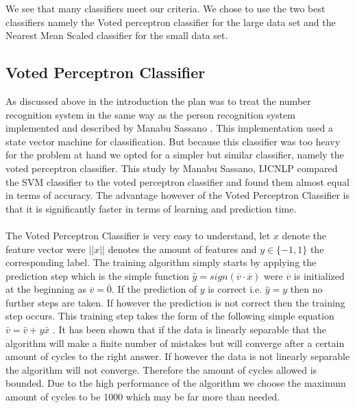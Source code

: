 \documentclass[%
        compressed,
        final,
        notitlepage,
        narroweqnarray,
        inline,
        twoside,
        ]{ieee}
\begin{document}
We see that many classifiers meet our criteria. We chose to use the two best
classifiers namely the Voted perceptron classifier for the large data set and
the Nearest Mean Scaled classifier for the small data set.

\subsection{Voted Perceptron Classifier}
As discussed above in the introduction the plan was to treat the number
recognition system in the same way as the person recognition system implemented
and described by Manabu Sassano \cite{Manabu}.
This implementation used a state vector machine for classification. But because
this classifier was too heavy for the problem at hand we opted for a simpler but
similar classifier, namely the voted perceptron classifier. This study by Manabu
Sassano, IJCNLP compared the SVM classifier to the voted perceptron classifier
and found them almost equal in terms of accuracy. The advantage however of the
Voted Perceptron Classifier is that it is significantly faster in terms of learning
and prediction time.\\\\
The Voted Perceptron Classifier is very easy to understand, let $x$ denote the
feature vector were $||x||$ denotes the amount of features and $y \in \{-1,1\}$
the corresponding label. The training algorithm simply starts by applying the
prediction step which is the simple function $\hat{y} =
sign(\overline{v}\cdot\overline{x})$ were $\overline{v}$ is
initialized at the beginning as $\overline{v}=\bar{0}$. If the prediction of $y$ is correct i.e.
$\hat{y}=y$
then no further steps are taken. If however the prediction is not correct then
the training step occurs. This training step takes the form of the following
simple equation $\bar{v}=\bar{v}+y\bar{x}$ . It has been shown that if the data is linearly separable that
the algorithm will make a finite number of mistakes but will converge after a
certain amount of cycles to the right answer. If however the data is not
linearly separable the algorithm will not converge. Therefore the amount of
cycles allowed is bounded. Due to the high performance of the algorithm we
choose the maximum amount of cycles to be 1000 which may be far more than
needed.

\end{document}
